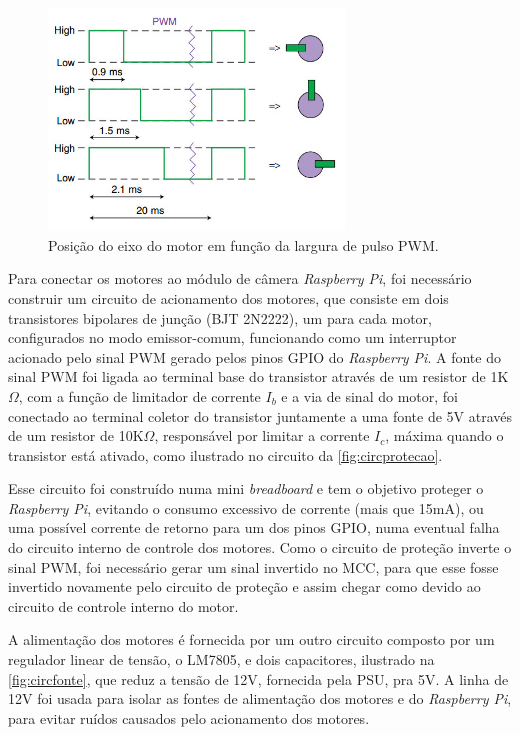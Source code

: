 \begin{figure}[H]
	\centering
	\includegraphics[width=0.7\textwidth]{figuras/pwm_servo.jpg}
	\caption{Posição do eixo do motor em função da largura de pulso PWM.}
	\label{fig:pwmservo}
\end{figure}

Para conectar os motores ao módulo de câmera \textit{Raspberry Pi}, foi necessário construir um circuito de acionamento dos motores, que consiste em dois transistores bipolares de junção (BJT 2N2222), um para cada motor, configurados no modo emissor-comum, funcionando como um interruptor acionado pelo sinal PWM gerado pelos pinos GPIO do \textit{Raspberry Pi}. A fonte do sinal PWM foi ligada ao terminal base do transistor através de um resistor de 1K$\Omega$, com a função de limitador de corrente $I_b$ e a via de sinal do motor, foi conectado ao terminal coletor do transistor juntamente a uma fonte de 5V através de um resistor de 10K$\Omega$, responsável por limitar a corrente $I_c$, máxima quando o transistor está ativado, como ilustrado no circuito da \autoref{fig:circprotecao}.\par

Esse circuito foi construído numa mini \textit{breadboard} e tem o objetivo proteger o \textit{Raspberry Pi}, evitando o consumo excessivo de corrente (mais que 15mA), ou uma possível corrente de retorno para um dos pinos GPIO, numa eventual falha do circuito interno de controle dos motores. Como o circuito de proteção inverte o sinal PWM, foi necessário gerar um sinal invertido no MCC, para que esse fosse invertido novamente pelo circuito de proteção e assim chegar como devido ao circuito de controle interno do motor.\par

A alimentação dos motores é fornecida por um outro circuito composto por um regulador linear de tensão, o LM7805, e dois capacitores, ilustrado na \autoref{fig:circfonte}, que reduz a tensão de 12V, fornecida pela PSU, pra 5V. A linha de 12V foi usada para isolar as fontes de alimentação dos motores e do \textit{Raspberry Pi}, para evitar ruídos causados pelo acionamento dos motores.

